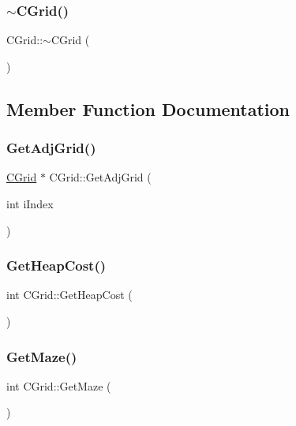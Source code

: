 \subsubsection{\texorpdfstring{$\sim$CGrid()}{~CGrid()}}
{\footnotesize\ttfamily C\+Grid\+::$\sim$\+C\+Grid (\begin{DoxyParamCaption}{ }\end{DoxyParamCaption})\hspace{0.3cm}{\ttfamily [virtual]}}



\subsection{Member Function Documentation}
\mbox{\label{classCGrid_a01a71c7e09d8dee33ef570b40120c3d3}} 
\subsubsection{\texorpdfstring{GetAdjGrid()}{GetAdjGrid()}}
{\footnotesize\ttfamily \mbox{\hyperlink{classCGrid}{C\+Grid}} $\ast$ C\+Grid\+::\+Get\+Adj\+Grid (\begin{DoxyParamCaption}\item[{int}]{i\+Index }\end{DoxyParamCaption})}

\mbox{\label{classCGrid_a8cc04f0ad9e054d50ad79e1acd398509}} 
\subsubsection{\texorpdfstring{GetHeapCost()}{GetHeapCost()}}
{\footnotesize\ttfamily int C\+Grid\+::\+Get\+Heap\+Cost (\begin{DoxyParamCaption}{ }\end{DoxyParamCaption})\hspace{0.3cm}{\ttfamily [inline]}}

\mbox{\label{classCGrid_a773d780808e0bd62f3f5867ca4fe102f}} 
\subsubsection{\texorpdfstring{GetMaze()}{GetMaze()}}
{\footnotesize\ttfamily int C\+Grid\+::\+Get\+Maze (\begin{DoxyParamCaption}{ }\end{DoxyParamCaption})\hspace{0.3cm}{\ttfamily [inline]}}

